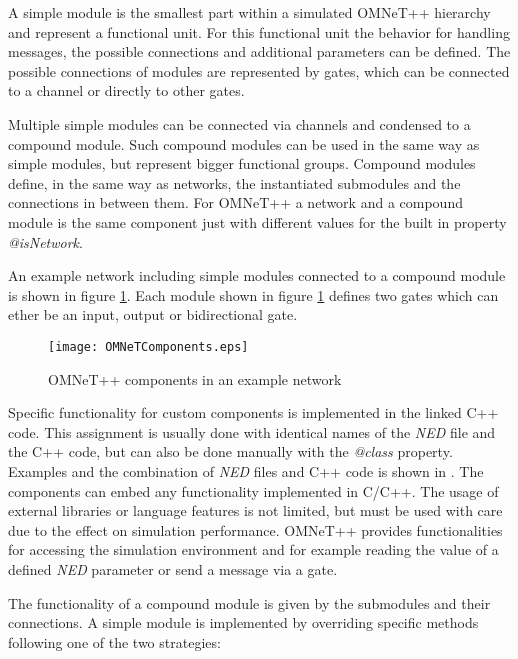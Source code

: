 A simple module is the smallest part within a simulated OMNeT++ hierarchy and represent a functional unit.
For this functional unit the behavior for handling messages, the possible connections and additional parameters can be defined. \cite[section 3.3]{omnet_manual}
The possible connections of modules are represented by gates, which can be connected to a channel or directly to other gates.

Multiple simple modules can be connected via channels and condensed to a compound module.
Such compound modules can be used in the same way as simple modules, but represent bigger functional groups.
Compound modules define, in the same way as networks, the instantiated submodules and the connections in between them. \cite[section 3.4]{omnet_manual}
For OMNeT++ a network and a compound module is the same component just with different values for the built in property \emph{@isNetwork}.

An example network including simple modules connected to a compound module is shown in figure \ref{fig:OMNeTComponents}.
Each module shown in figure \ref{fig:OMNeTComponents} defines two gates which can ether be an input, output or bidirectional gate.

\begin{figure}
    \centering
    \texttt{[image: OMNeTComponents.eps]}
    \caption{OMNeT++ components in an example network}
    \label{fig:OMNeTComponents}
\end{figure}

Specific functionality for custom components is implemented in the linked C++ code.
This assignment is usually done with identical names of the \emph{NED} file and the C++ code, but can also be done manually with the \emph{@class} property.
Examples and the combination of \emph{NED} files and C++ code is shown in \cite[chapter 3, chapter 4]{omnet_manual}.
The components can embed any functionality implemented in C/C++.
The usage of external libraries or language features is not limited, but must be used with care due to the effect on simulation performance.
OMNeT++ provides functionalities for accessing the simulation environment and for example reading the value of a defined \emph{NED} parameter or send a message via a gate.

The functionality of a compound module is given by the submodules and their connections.
A simple module is implemented by overriding specific methods following one of the two strategies:


